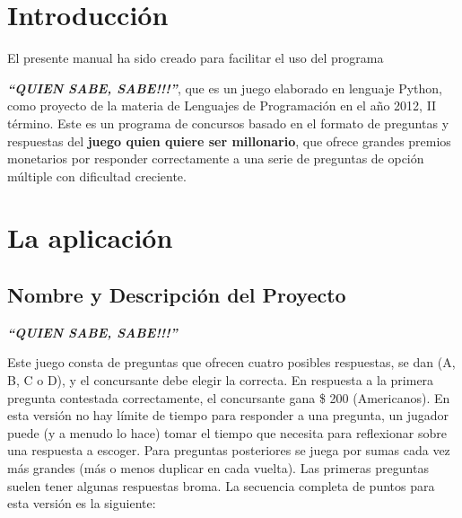 \documentclass[a4paper,11pt]{article}
\begin{document}
\newpage 

\setlength{\topmargin}{-0,2in}
\tableofcontents

\newpage 

\section{Introducci\'{o}n}
El presente manual ha sido creado para facilitar el uso del programa {\textbf{\textit{``QUIEN SABE, SABE!!!''}}, que es un juego elaborado en lenguaje Python, como proyecto de la materia de Lenguajes de Programaci\'{o}n en el a\~{n}o 2012, II t\'{e}rmino.
\newline
\newline
Este es un programa de concursos basado en el formato de preguntas y respuestas del \textbf{juego quien quiere ser millonario}, que ofrece grandes premios monetarios por responder correctamente a una serie de preguntas de opci\'{o}n m\'{u}ltiple con dificultad creciente.  
\newline
\newline
\section{La aplicaci\'{o}n}

\subsection{Nombre y Descripci\'{o}n del Proyecto}
\vspace{1.5em}
 \centerline{\textbf{\textit{ ``QUIEN SABE, SABE!!!''}}}
\vspace{1.5em}
Este juego consta de preguntas que ofrecen cuatro posibles respuestas, se dan (A, B, C o D), y el concursante debe elegir la correcta. En respuesta a la primera pregunta contestada correctamente, el concursante gana \$ 200 (Americanos). En esta versi\'{o}n no hay l\'{i}mite de tiempo para responder a una pregunta, un jugador puede (y a menudo lo hace) tomar el tiempo que necesita para reflexionar sobre una respuesta a escoger.
\newline
\newline
Para preguntas posteriores se juega por sumas cada vez m\'{a}s grandes (m\'{a}s o menos duplicar en cada vuelta). Las primeras preguntas suelen tener algunas respuestas broma. La secuencia completa de puntos para esta versi\'{o}n es la siguiente:
\newline



}
\end{document}
